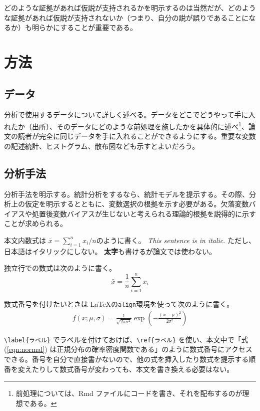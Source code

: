 \documentclass[10.5pt,a4paper,lualatex,ja=standard]{bxjsarticle}
\begin{document}
どのような証拠があれば仮説が支持されるかを明示するのは当然だが、どのような証拠があれば仮説が支持されないか（つまり、自分の説が誤りであることになるか）も明らかにすることが重要である。

\section{方法}\label{ux65b9ux6cd5}

\subsection{データ}\label{ux30c7ux30fcux30bf}

分析で使用するデータについて詳しく述べる。データをどこでどうやって手に入れたか（出所）、そのデータにどのような前処理を施したかを具体的に述べ\footnote{前処理については、Rmd ファイルにコードを書き、それを配布するのが理想である。}、論文の読者が完全に同じデータを手に入れることができるようにする。重要な変数の記述統計、ヒストグラム、散布図なども示すとよいだろう。

\subsection{分析手法}\label{ux5206ux6790ux624bux6cd5}

分析手法を明示する。統計分析をするなら、統計モデルを提示する。その際、分析上の仮定を明示するとともに、変数選択の根拠を示す必要がある。欠落変数バイアスや処置後変数バイアスが生じないと考えられる理論的根拠を説得的に示すことが求められる。

本文内数式は \(\bar{x} = \sum_{i=1}^n x_i / n\)のように書く。 \emph{This sentence is in italic}. ただし、日本語はイタリックにしない。 \textbf{太字}も書けるが論文では使わない。

独立行での数式は次のように書く。
\[
\bar{x} = \frac{1}{n} \sum_{i=1}^n x_i
\]

数式番号を付けたいときは \LaTeX  の\texttt{align}環境を使って次のように書く。
\begin{align}
f(x ; \mu, \sigma) = \frac{1}{\sqrt{2\pi \sigma^2}}
  \exp \left( -\frac{(x - \mu)^2}{2 \sigma^2} \right)
  \label{eqn:normal}
\end{align}

\texttt{\textbackslash{}label\{ラベル\}} でラベルを付けておけば、\texttt{\textbackslash{}ref\{ラベル\}} を使い、本文中で「式 (\ref{eqn:normal}) は正規分布の確率密度関数である」のように数式番号にアクセスできる。番号を自分で直接書かないので、他の式を挿入したり数式を提示する順番を変えたりして数式番号が変わっても、本文を書き換える必要はない。
\end{document}
